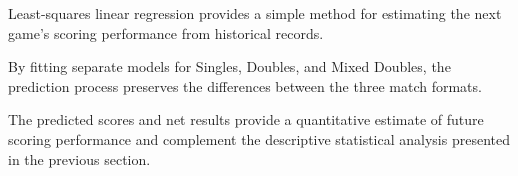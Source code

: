 Least-squares linear regression provides a simple
method for estimating the next game's scoring
performance from historical records.

By fitting separate models for Singles, Doubles,
and Mixed Doubles, the prediction process preserves
the differences between the three match formats.

The predicted scores and net results provide a
quantitative estimate of future scoring performance
and complement the descriptive statistical analysis
presented in the previous section.

